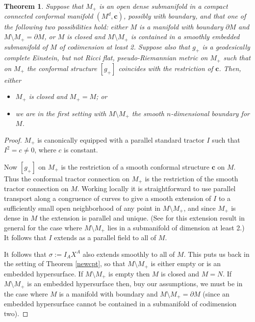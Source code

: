 \documentclass[a4paper,12pt]{amsart}
\def\g{g_+}
\def\M{M_+}
\newcommand{\cc}{\boldsymbol{c}}
\newcommand{\si}{\sigma}
\newtheorem{theorem}{Theorem}[section]
\theoremstyle{remark}
\begin{document}
\begin{theorem} \label{cify} Suppose that
$\M$ is an open dense submanifold in a compact connected conformal manifold $(M^d,\cc)$, possibly with boundary, and that one of the following two possibilities hold: either $M$ is a manifold with boundary $\partial M$ and $M\setminus \M =\partial M$, or $M$ is closed and $M\setminus \M$ is contained in a smoothly embedded submanifold of $M$ of codimension at least 2. Suppose also that $\g$ is a geodesically complete Einstein, but not Ricci flat, pseudo-Riemannian metric on $\M$ such that on $\M$ the conformal structure $[\g]$ coincides with the restriction of $\cc$.
 Then, either
    \begin{itemize}
        \item $\M$ is closed and $\M = M$; or
        \item we are in the first setting with
          $M\setminus \M$ the smooth $n$-dimensional
          boundary for $M$.  
    \end{itemize}
\end{theorem}
\begin{proof}
$\M$ is  canonically equipped with  a parallel standard tractor $I$
such that $I^2=c\neq 0$, where $c$ is constant.

Now $[\g]$ on $\M$ is the restriction of a smooth conformal structure
$\cc$ on $M$. Thus the conformal tractor connection on $\M$ is the
restriction of the smooth tractor connection on $M$. Working locally
it is straightforward to use parallel transport along a congruence of
curves to give a smooth extension of $I$ to a sufficiently small open
neighborhood of any point in $M\setminus \M$, and since $\M$ is dense
in $M$ the extension is parallel and unique. (See \cite{DiScalaManno} for
this extension result in general for the case where $M\setminus \M$ lies in
a submanifold of dimension at least 2.)  It follows that $I$
extends as a parallel field to all of $M$.

It follows that $\si:=I_A X^A$ also extends smoothly to
all of $M$. This puts us back in the setting of Theorem \ref{newcpt}, so that $M\setminus \M$ is either empty or is an embedded hypersurface. If $M\setminus \M$ is empty then $M$ is closed and $M=N$. If $M\setminus \M$ is an embedded hypersurface then, buy our assumptions, we must be in the case where $M$ is a manifold with boundary and $M\setminus \M=\partial M$ (since an embedded hypersurface cannot be contained in a submanifold of codimension two).
\end{proof}
\end{document}

